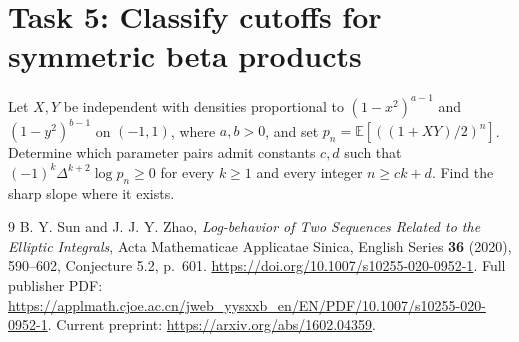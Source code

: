\documentclass[11pt]{article}
\begin{document}
\section*{Task 5: Classify cutoffs for symmetric beta products}
Let $X,Y$ be independent with densities proportional to
$(1-x^2)^{a-1}$ and $(1-y^2)^{b-1}$ on $(-1,1)$, where $a,b>0$,
and set $p_n=\mathbb E[((1+XY)/2)^n]$.
Determine which parameter pairs admit constants $c,d$ such that
$(-1)^k\Delta^{k+2}\log p_n\geq0$ for every $k\geq1$
and every integer $n\geq ck+d$. Find the sharp slope where it exists.

\begin{thebibliography}{9}
B. Y. Sun and J. J. Y. Zhao, \emph{Log-behavior of Two Sequences Related
to the Elliptic Integrals}, Acta Mathematicae Applicatae Sinica,
English Series \textbf{36} (2020), 590--602,
Conjecture 5.2, p.~601.
\url{https://doi.org/10.1007/s10255-020-0952-1}.
Full publisher PDF:
\url{https://applmath.cjoe.ac.cn/jweb_yysxxb_en/EN/PDF/10.1007/s10255-020-0952-1}.
Current preprint: \url{https://arxiv.org/abs/1602.04359}.
\end{thebibliography}
\end{document}
